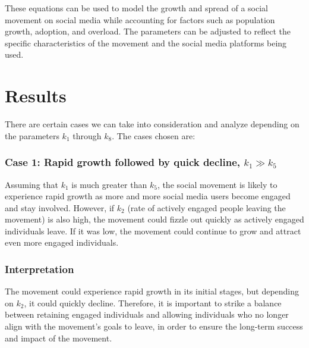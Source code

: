 \documentclass{article}
\begin{document}
	These equations can be used to model the growth and spread of a social movement on social media while accounting for factors such as population growth, adoption, and overload. The parameters can be adjusted to reflect the specific characteristics of the movement and the social media platforms being used.
 

    \section{Results}
    
    There are certain cases we can take into consideration and analyze depending on the parameters $k_1$ through $k_8$. The cases chosen are: 


    \subsubsection*{Case 1: Rapid growth followed by quick decline, $k_1 \gg k_5$} \normalfont
    \begin{tcolorbox}
    Assuming that $k_1$  is much greater than $k_5$, the social movement is likely to experience rapid growth as more and more social media users become engaged and stay involved. However, if $k_2$ (rate of actively engaged people leaving the movement) is also high, the movement could fizzle out quickly as actively engaged individuals leave. If it was low, the movement could continue to grow and attract even more engaged individuals.
    \subsubsection*{Interpretation}  The movement could experience rapid growth in its initial stages, but depending on $k_2$, it could quickly decline. Therefore, it is important to strike a balance between retaining engaged individuals and allowing individuals who no longer align with the movement's goals to leave, in order to ensure the long-term success and impact of the movement.
    \end{tcolorbox}
\end{document}
